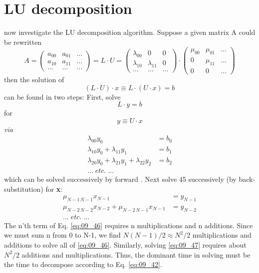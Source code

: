 \section{LU decomposition}
 now investigate the LU decomposition algorithm. Suppose a given matrix A could be rewritten
\begin{equation}
    \label{eq:09_42}
    A = 
    \begin{pmatrix}
        a_{00}&a_{01} &\dots\\
        a_{10}&a_{11} &\dots\\
        \dots&\dots &\dots
    \end{pmatrix}
    = L \cdot U =
    \begin{pmatrix}
        \lambda_{00}&0 &0\\
        \lambda_{10}&\lambda_{11} &0\\
        \dots&\dots &\dots
    \end{pmatrix}
    \cdot
    \begin{pmatrix}
        \mu_{00}&\mu_{01} &\dots\\
        0&\mu_{11} &\dots\\
        0&0 &\dots
    \end{pmatrix}
\end{equation} 
then the solution of
\begin{equation}
    \label{eq:09_43}
    (L \cdot U ) \cdot x \equiv L \cdot (U \cdot x) = b
\end{equation} 
can be found in two steps: First, solve
\begin{equation}
    \label{eq:09_44}
    L \cdot y = b
\end{equation} 
for
\begin{equation}
    \label{eq:09_45}
    y \equiv U  \cdot x
\end{equation} 
\textit{via}
\begin{align}
    \label{eq:09_46}
    \lambda_{00} y_0 &= b_0 \nonumber \\
    \lambda_{10} y_0 + \lambda_{11} y_1 &= b_1 \\
    \lambda_{20} y_0 + \lambda_{21} y_1 + \lambda_{22} y_2 &= b_2 \nonumber \\
    \dots \;\textit{etc.} \;\dots \nonumber
\end{align}
which can be solved successively by forward . Next
solve 45 successively (by back-substitution) for \textbf{x}:
\begin{align}
    \label{eq:09_47}
    \mu_{N-1\, N-1} x_{N-1} &= y_{N-1} \nonumber \\
    \mu_{N-2\, N-2} x_{N-2} + \mu_{N-2\, N-1} x_{N-1} &= y_{N-2} \\
    \dots \;\textit{etc.} \;\dots \nonumber
\end{align}
The n'th term of Eq. \ref{eq:09_46} requires n multiplications and n additions.
Since we must sum n from 0 to N-1, we find $N(N-1)/2 \approx N^2/2$
multiplications and additions to solve all of \ref{eq:09_46}. Similarly, solving 
\ref{eq:09_47} requires about $N^2/2$ additions and multiplications. Thus, the
dominant time in solving must be the time to decompose according to Eq. \ref{eq:09_42}.

